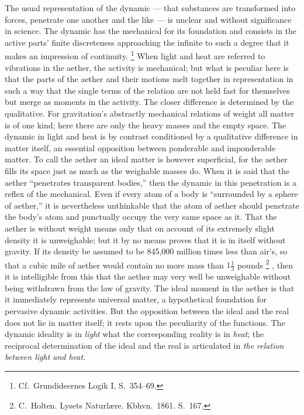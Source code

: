 \documentclass[12pt,a4paper]{book}
\renewcommand{\thefootnote}{*)}
\begin{document}
The usual representation of the dynamic --- that substances are transformed into forces, penetrate one another and the
like --- is unclear and without significance in science. The dynamic has the mechanical for its foundation and consists
in
the active parts' finite discreteness approaching the infinite to such a degree that it makes an impression of
continuity.%
\footnote{%
Cf.\ Grundideernes Logik I, S.\ 354--69.}
When light and heat are referred to vibrations in the aether, the activity is mechanical; but what is peculiar here is
that the parts of the aether and their motions melt together in representation in such a way that the single terms of
the relation are not held fast for themselves but merge as moments in the activity. The closer difference is determined
by the qualitative. For gravitation's abstractly mechanical relations of weight all matter is of one kind; here there
are only the heavy masses and the empty space. The dynamic in light and heat is by contrast conditioned by a
qualitative difference in matter itself, an essential opposition between ponderable and imponderable matter. To call
the aether an ideal matter is however superficial, for the aether fills its space just as much as the weighable masses
do. When it is said that the aether ``penetrates transparent bodies,'' then the dynamic in this penetration is a reflex
of the mechanical. Even if every atom of a body is ``surrounded by a sphere of aether,'' it is nevertheless unthinkable
that the atom of aether should penetrate the body's atom and punctually occupy the very same space as it. That the
aether is without weight means only that on account of its extremely slight density it is unweighable; but it by no
means proves that it is in itself without gravity. If its density be assumed to be 845,000 million times less than
air's, so that a cubic mile of aether would contain no more mass than
$1\tfrac{1}{3}$ pounds%
\renewcommand{\thefootnote}{**)}%
\footnote{%
C.\ Holten. Lysets Naturlære. Kbhvn.\ 1861. S.\ 167.}%
\renewcommand{\thefootnote}{*)}%
, then it is intelligible from this that the aether may very well be unweighable without being withdrawn from the law of
gravity. The ideal moment in the aether is that it immediately represents universal matter, a hypothetical foundation
for pervasive dynamic activities.
But the opposition between the ideal and the real does not lie in matter itself; it rests upon the peculiarity of the
functions. The dynamic ideality is in \emph{light} what the corresponding reality is in \emph{heat}; the reciprocal
determination of the ideal and the real is articulated in \emph{the relation between light and heat}.
\end{document}
